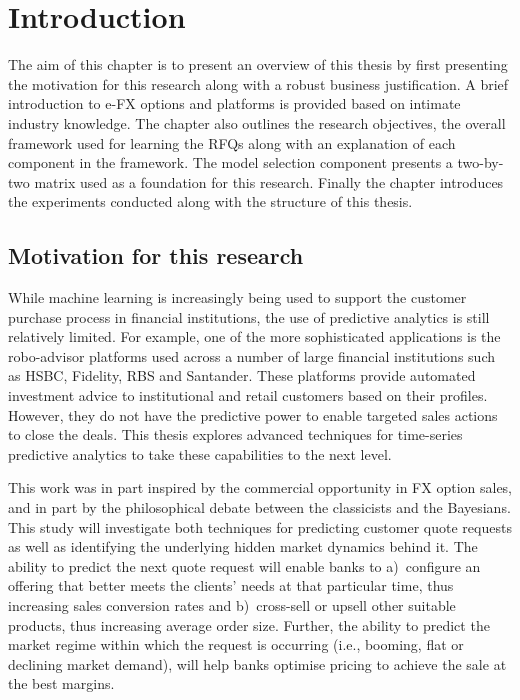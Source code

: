 \chapter{Introduction}\label{Ch:1}
\begin{singlespacing}
\begin{microabstract}
    The aim of this chapter is to present an overview of this thesis by first presenting the motivation for this research along with a robust business justification. A brief introduction to e-FX options and platforms is provided based on intimate industry knowledge. The chapter also outlines the research objectives, the overall framework used for learning the RFQs along with an explanation of each component in the framework. The model selection component presents a two-by-two matrix used as a foundation for this research. Finally the chapter introduces the experiments conducted along with the structure of this thesis.
\end{microabstract}
\end{singlespacing}


\section{Motivation for this research}\label{Ch1Sec1}
While machine learning is increasingly being used to support the customer purchase process in financial institutions, the use of predictive analytics is still relatively limited. For example, one of the more sophisticated applications is the robo-advisor platforms used across a number of large financial institutions such as HSBC, Fidelity, RBS and Santander. These platforms provide automated investment advice to institutional and retail customers based on their profiles. However, they do not have the predictive power to enable targeted sales actions to close the deals. This thesis explores advanced techniques for time-series predictive analytics to take these capabilities to the next level.

This work was in part inspired by the commercial opportunity in FX option sales, and in part by the philosophical debate between the classicists and the Bayesians. This study will investigate both techniques for predicting customer quote requests as well as identifying the underlying hidden market dynamics behind it. The ability to predict the next quote request will enable banks to a)~configure an offering that better meets the clients’ needs at that particular time, thus increasing sales conversion rates and b)~cross-sell or upsell other suitable products, thus increasing average order size. Further, the ability to predict the market regime within which the request is occurring (i.e., booming, flat or declining market demand), will help banks optimise pricing to achieve the sale at the best margins.

